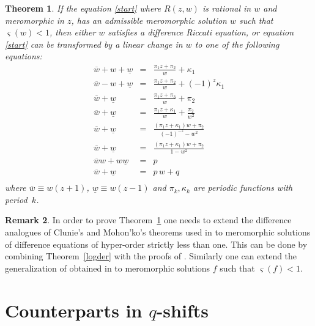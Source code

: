 \documentclass{amsart}
\newcommand{\wdn}{\underline w}
\newcommand{\wu}{\overline w}
\newtheorem{theorem}{Theorem}%
\theoremstyle{definition}
\newtheorem{remark}[theorem]{Remark}
\numberwithin{equation}{section}
\numberwithin{theorem}{section}
\begin{document}
\begin{theorem}\label{pthm}
If the equation \eqref{start} where $R(z,w)$ is rational in $w$
and meromorphic in $z$, has an admissible meromorphic solution $w$
such that $\varsigma(w)<1$, then either $w$ satisfies a difference
Riccati equation, or equation \eqref{start} can be transformed by
a linear change in $w$ to one of the following equations:
    \begin{eqnarray*}
    \wu+ w + \wdn &=& \frac{\pi_1 z + \pi_2}{w} + \kappa_1\nonumber   \\
    \wu- w + \wdn &=& \frac{\pi_1 z + \pi_2}{w} + (-1)^z\kappa_1\nonumber \\
    \wu+\wdn &=& \frac{\pi_1 z + \pi_3}{w} + \pi_2  \nonumber \\
    \wu+\wdn &=& \frac{\pi_1 z + \kappa_1}{w} + \frac{\pi_2}{w^2}\nonumber   \\
    \wu+\wdn &=&\frac{(\pi_1 z+\kappa_1)w+\pi_2}{(-1)^{-z}-w^2}  \nonumber \\
    \wu+\wdn &=&\frac{(\pi_1 z+\kappa_1)w+\pi_2}{1-w^2} \nonumber \\
     \wu w+w\wdn &=& p \nonumber   \\
    \wu+\wdn &=& p\,w+q \nonumber\\
    \end{eqnarray*}
where $\overline{w}\equiv w(z+1)$, $\underline{w}\equiv w(z-1)$ and  $\pi_k,\kappa_k$ are periodic functions with period~$k$.
\end{theorem}

\begin{remark}
In order to prove Theorem~\ref{pthm} one needs to extend the difference analogues of Clunie's and Mohon'ko's theorems used in \cite{halburdk:07PLMS} to meromorphic solutions of difference equations of hyper-order strictly less than one. This can be done by combining Theorem~\ref{logder} with the proofs of \cite[Theorem 3.1--3.2]{halburdk:06JMAA}. Similarly one can extend the generalization of \cite[Theorem 3.1]{halburdk:06JMAA} obtained in \cite{lainey:07} to meromorphic solutions $f$ such that $\varsigma(f)<1$.
\end{remark}


\section{Counterparts in $q$-shifts}\label{section_q}
\end{document}
